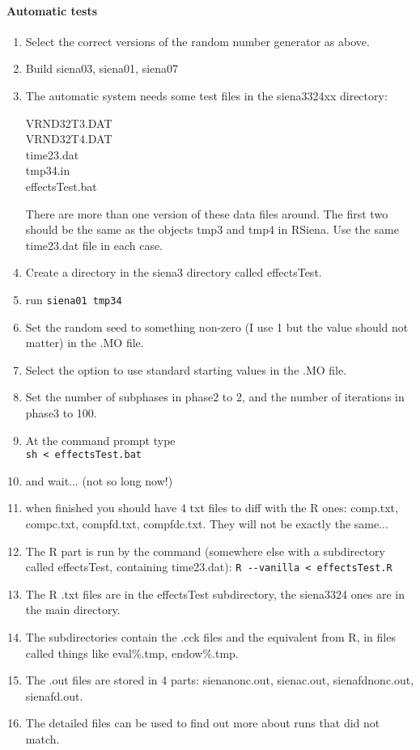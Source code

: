 \documentclass[12pt, a4paper]{article}
\renewcommand{\=}{\,=\,}
\newcommand{\+}{\,+\,}
\begin{document}
\paragraph{Automatic tests}
\begin{enumerate}
\item
Select the correct versions of the random number generator as above.
\item Build  siena03, siena01, siena07
\item The automatic system needs some test files in the siena3324xx directory:
\begin{description}
\item[VRND32T3.DAT]
\item[VRND32T4.DAT]
\item[time23.dat]
\item[tmp34.in]
\item[effectsTest.bat]
\end{description}
There are more than one version of these data files around. The first two should
be the same as the objects tmp3 and tmp4 in RSiena. Use the same time23.dat file
in each case.
\item Create a directory in the siena3 directory called effectsTest.
\item  run \verb|siena01 tmp34|
\item Set the random seed to something non-zero (I use 1 but the value
  should not matter) in the .MO file.
\item Select the option to use standard starting values in the
  .MO file.
\item Set the number of subphases in phase2 to 2, and the number of iterations
  in phase3 to 100.
\item At the command prompt type\\
\verb|sh < effectsTest.bat|
\item and wait... (not so long now!)
\item when finished you should have 4 txt files to diff with the R ones:
  comp.txt, compc.txt, compfd.txt, compfdc.txt. They will not be exactly the
  same...
\item The R part is run by the command (somewhere else with a subdirectory
  called effectsTest, containing time23.dat):
 \verb|R --vanilla < effectsTest.R|
\item The R .txt files are in the effectsTest subdirectory, the siena3324 ones
  are in the main directory.
\item The subdirectories contain the .cck files and the equivalent from R, in
  files called things like eval\%.tmp, endow\%.tmp.
\item The .out files are stored in 4 parts: sienanonc.out, sienac.out,
  sienafdnonc.out, sienafd.out.
\item The detailed files can be used to find out more about runs that did not
  match.
\end{enumerate}
\end{document}
